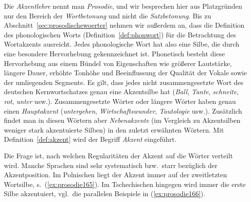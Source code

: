 \begin{exe}
  \ex\label{ex:prosodie156}
  \begin{xlist}
  \end{xlist}
\end{exe}

Die \textit{Akzentlehre} nennt man \textit{Prosodie}, und wir besprechen hier aus Platzgründen nur den Bereich der \textit{Wortbetonung} und \zB nicht die \textit{Satzbetonung}.
Bis zu Abschnitt~\ref{sec:prosodischewoerter} nehmen wir außerdem an, dass die Definition des phonologischen Worts (Definition~\ref{def:phonwort}) für die Betrachtung des Wortakzents ausreicht.
Jedes phonologische Wort hat also eine Silbe, die durch eine besondere Hervorhebung gekennzeichnet ist.
Phonetisch besteht diese Hervorhebung aus einem Bündel von Eigenschaften wie größerer Lautstärke, längere Dauer, erhöhte Tonhöhe und Beeinflussung der Qualität der Vokale sowie der umliegenden Segmente.
Es gilt, dass jedes nicht zusammengesetzte Wort des deutschen Kernwortschatzes genau eine Akzentsilbe hat (\textit{\Akz Ball}, \textit{\Akz Tante}, \textit{\Akz schneite}, \textit{\Akz rot}, \textit{\Akz unter} usw.).
Zusammengesetzte Wörter oder längere Wörter haben genau einen \textit{Hauptakzent} (\textit{\Akz untergehen}, \textit{\Akz Wirtschaftswunder}, \textit{Tautolo\Akz gie} usw.).
Zusätzlich findet man in diesen Wörtern aber \textit{Nebenakzente} (im Vergleich zu Akzentsilben weniger stark akzentuierte Silben) in den zuletzt erwähnten Wörtern.
Mit Definition~\ref{def:akzent} wird der Begriff \textit{Akzent} eingeführt.


Die Frage ist, nach welchen Regularitäten der Akzent auf die Wörter verteilt wird.
Manche Sprachen sind sehr systematisch bzw.\ starr bezüglich der Akzentposition.
Im Polnischen liegt der Akzent immer auf der zweitletzten Wortsilbe, s.\ (\ref{ex:prosodie165}).
Im Tschechischen hingegen wird immer die erste Silbe akzentuiert, vgl.\ die parallelen Beispiele in (\ref{ex:prosodie166}).


